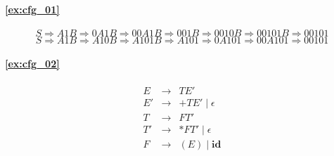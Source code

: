 \paragraph{\ref{ex:cfg_01}}

\[
 S \Rightarrow A1B \Rightarrow 0A1B \Rightarrow 00A1B \Rightarrow
 001B \Rightarrow 0010B \Rightarrow 00101B \Rightarrow 00101
\]
\[
 S \Rightarrow A1B \Rightarrow A10B \Rightarrow A101B \Rightarrow
 A101 \Rightarrow 0A101 \Rightarrow 00A101 \Rightarrow 00101
\]

\paragraph{\ref{ex:cfg_02}}

\begin{eqnarray*}
 E & \rightarrow & TE' \\
 E' & \rightarrow & + TE' \mid \epsilon \\
 T & \rightarrow & FT' \\
 T' & \rightarrow & * FT' \mid \epsilon \\
 F & \rightarrow & (E) \mid \mathbf{id}
\end{eqnarray*}
